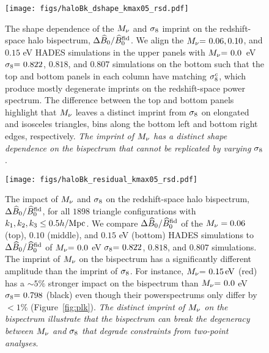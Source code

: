 \begin{figure}
\begin{center}
\texttt{[image: figs/haloBk\_dshape\_kmax05\_rsd.pdf]} 
    \caption{The shape dependence of the $M_\nu$ and $\sigma_8$ imprint on 
    the redshift-space halo bispectrum, $\Delta \widehat{B}_0/\widehat{B}_0^\mathrm{fid}$. 
    We align the $M_\nu{=}~0.06, 0.10$, and $0.15$ eV HADES simulations 
    in the upper panels with $M_\nu{=}~0.0$~eV $\sigma_8{=}~0.822$, $0.818$, and $0.807$ 
    simulations on the bottom such that the top and bottom panels in each column 
    have matching $\sigma_8^{c}$, which produce mostly degenerate imprints on the 
    redshift-space power spectrum. The difference between the top and bottom 
    panels highlight that $M_\nu$ leaves a distinct imprint from $\sigma_8$ on 
    elongated and isosceles triangles, bins along the bottom left and bottom 
    right edges, respectively. {\em The imprint of $M_\nu$ has a distinct shape 
    dependence on the bispectrum that cannot be replicated by varying $\sigma_8$}. 
    }
\label{fig:dbk_shape}
\end{center}
\end{figure}

\begin{figure}
\begin{center}
\texttt{[image: figs/haloBk\_residual\_kmax05\_rsd.pdf]}
    \caption{The impact of $M_\nu$ and $\sigma_8$ on the redshift-space halo bispectrum,
    $\Delta \widehat{B}_0/\widehat{B}_0^\mathrm{fid}$, for all $1898$ triangle configurations with 
    $k_1, k_2, k_3 \leq 0.5 h/{\rm Mpc}$. We compare $\Delta \widehat{B}_0/\widehat{B}_0^\mathrm{fid}$ 
    of the $M_\nu = 0.06$ (top), $0.10$ (middle), and $0.15$ eV (bottom) HADES simulations 
    to $\Delta \widehat{B}_0/\widehat{B}_0^\mathrm{fid}$ of $M_\nu{=}~0.0$ eV $\sigma_8{=}~0.822$, $0.818$, and 
    $0.807$ simulations. The imprint of $M_\nu$ on the bispectrum has a significantly different 
    amplitude than the imprint of $\sigma_8$. For instance, $M_\nu{=}~0.15\,\mathrm{eV}$ (red) 
    has a $\sim 5\%$ stronger impact on the bispectrum than $M_\nu{=}~0.0$ eV  
    $\sigma_8{=}~0.798$ (black) even though their powerspectrums only differ by $< 1\%$ 
    (Figure~\ref{fig:plk}). {\em The distinct imprint of $M_\nu$ on the bispectrum 
    illustrate that the bispectrum can break the degeneracy between $M_\nu$ and $\sigma_8$ 
    that degrade constraints from two-point analyses}.
    }
\label{fig:dbk_amp}
\end{center}
\end{figure}
